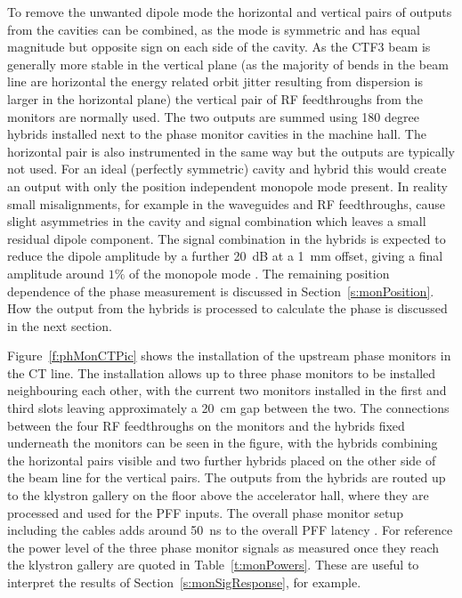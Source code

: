 To remove the unwanted dipole mode the horizontal and vertical pairs of outputs from the cavities can be combined, as the mode is symmetric and has equal magnitude but opposite sign on each side of the cavity. As the CTF3 beam is generally more stable in the vertical plane (as the majority of bends in the beam line are horizontal the energy related orbit jitter resulting from dispersion is larger in the horizontal plane) the vertical pair of RF feedthroughs from the monitors are normally used. The two outputs are summed using 180 degree hybrids \cite{alexCWS13} installed next to the phase monitor cavities in the machine hall. The horizontal pair is also instrumented in the same way but the outputs are typically not used. For an ideal (perfectly symmetric) cavity and hybrid this would create an output with only the position independent monopole mode present. In reality small misalignments, for example in the waveguides and RF feedthroughs, cause slight asymmetries in the cavity and signal combination which leaves a small residual dipole component. The signal combination in the hybrids is expected to reduce the dipole amplitude by a further 20~dB at a 1~mm offset, giving a final amplitude around \(1\%\) of the monopole mode \cite{alexCWS13}. The remaining position dependence of the phase measurement is discussed in Section~\ref{s:monPosition}. How the output from the hybrids is processed to calculate the phase is discussed in the next section.

Figure~\ref{f:phMonCTPic} shows the installation of the upstream phase monitors in the CT line. The installation allows up to three phase monitors to be installed neighbouring each other, with the current two monitors installed in the first and third slots leaving approximately a 20~cm gap between the two. The connections between the four RF feedthroughs on the monitors and the hybrids fixed underneath the monitors can be seen in the figure, with the hybrids combining the horizontal pairs visible and two further hybrids placed on the other side of the beam line for the vertical pairs. The outputs from the hybrids are routed up to the klystron gallery on the floor above the accelerator hall, where they are processed and used for the PFF inputs. The overall phase monitor setup including the cables adds around 50~ns to the overall PFF latency \cite{alexPriv}. For reference the power level of the three phase monitor signals as measured once they reach the klystron gallery are quoted in Table~\ref{t:monPowers}. These are useful to interpret the results of Section~\ref{s:monSigResponse}, for example. %

